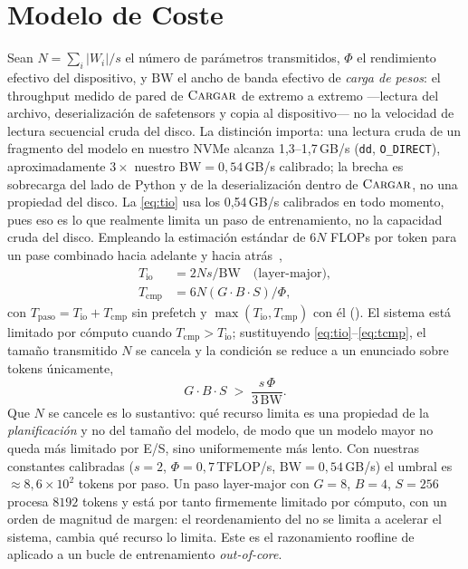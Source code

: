 \documentclass[journal]{IEEEtran}
\begin{document}
\section{Modelo de Coste}
\label{sec:cost}

Sean $N = \sum_i |W_i| / s$ el número de parámetros transmitidos, $\Phi$ el rendimiento efectivo del
dispositivo, y $\mathrm{BW}$ el ancho de banda efectivo de \emph{carga de pesos}: el throughput
medido de pared de $\textsc{Cargar}$ de extremo a extremo ---lectura del archivo, deserialización de
safetensors y copia al dispositivo--- no la velocidad de lectura secuencial cruda del disco. La
distinción importa: una lectura cruda de un fragmento del modelo en nuestro NVMe alcanza
1,3--1,7\,GB/s (\texttt{dd}, \texttt{O\_DIRECT}), aproximadamente $3\times$ nuestro
$\mathrm{BW}=0{,}54$\,GB/s calibrado; la brecha es sobrecarga del lado de Python y de la
deserialización dentro de $\textsc{Cargar}$, no una propiedad del disco. La \eqref{eq:tio} usa los
0,54\,GB/s calibrados en todo momento, pues eso es lo que realmente limita un paso de entrenamiento,
no la capacidad cruda del disco. Empleando la estimación
estándar de $6N$ FLOPs por token para un pase combinado hacia adelante y hacia
atrás~\cite{kaplan2020scaling},
\begin{align}
T_{\text{io}}  &= 2Ns/\mathrm{BW} \quad \text{(layer-major)}, \label{eq:tio}\\
T_{\text{cmp}} &= 6N (G\cdot B\cdot S)/\Phi, \label{eq:tcmp}
\end{align}
con $T_{\text{paso}} = T_{\text{io}} + T_{\text{cmp}}$ sin prefetch y
$\max(T_{\text{io}}, T_{\text{cmp}})$ con él (). El sistema está limitado por
cómputo cuando $T_{\text{cmp}} > T_{\text{io}}$; sustituyendo \eqref{eq:tio}--\eqref{eq:tcmp}, el
tamaño transmitido $N$ se cancela y la condición se reduce a un enunciado sobre tokens únicamente,
\begin{equation}
\label{eq:regime}
G\cdot B\cdot S \;>\; \frac{s\,\Phi}{3\,\mathrm{BW}} .
\end{equation}
Que $N$ se cancele es lo sustantivo: qué recurso limita es una propiedad de la
\emph{planificación} y no del tamaño del modelo, de modo que un modelo mayor no queda más limitado
por E/S, sino uniformemente más lento. Con nuestras constantes calibradas ($s=2$,
$\Phi = 0{,}7$\,TFLOP/s, $\mathrm{BW}=0{,}54$\,GB/s) el umbral es $\approx 8{,}6\times 10^{2}$
tokens por paso. Un paso layer-major con $G=8$, $B=4$, $S=256$ procesa $8192$ tokens y está por
tanto firmemente limitado por cómputo, con un orden de magnitud de margen: el reordenamiento del
 no se limita a acelerar el sistema, cambia qué recurso lo limita. Este es el
razonamiento roofline de~\cite{williams2009roofline} aplicado a un bucle de entrenamiento
\emph{out-of-core}.
\end{document}
